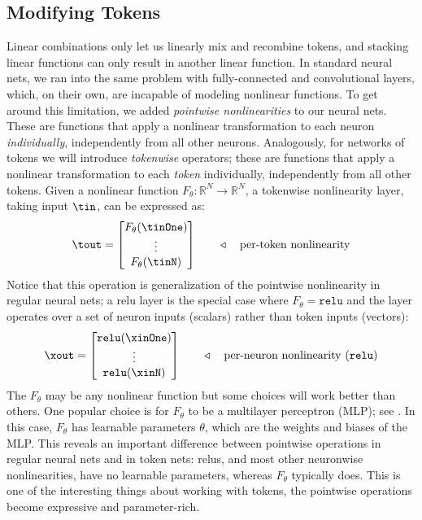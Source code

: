 \subsection{Modifying Tokens}\label{sec:transformers:modifying_tokens}
Linear combinations only let us linearly mix and recombine tokens, and stacking linear functions can only result in another linear function. In standard neural nets, we ran into the same problem with fully-connected and convolutional layers, which, on their own, are incapable of modeling nonlinear functions. To get around this limitation, we added \textit{pointwise nonlinearities} to our neural nets. These are functions that apply a nonlinear transformation to each neuron \textit{individually}, independently from all other neurons. Analogously, for networks of tokens we will introduce \textit{tokenwise} operators; these are functions that apply a nonlinear transformation to each \textit{token} individually, independently from all other tokens. Given a nonlinear function $F_{\theta}: \mathbb{R}^N \rightarrow \mathbb{R}^N$, a tokenwise nonlinearity layer, taking input $\tin$, can be expressed as:
\begin{align}
    \tout = 
        \begin{bmatrix}
        F_{\theta}(\tinOne) \\
        \vdots \\
        F_{\theta}(\tinN) \\
        \end{bmatrix}\quad\quad \triangleleft \quad\text{per-token nonlinearity}
\end{align}
Notice that this operation is generalization of the pointwise nonlinearity in regular neural nets; a relu layer is the special case where $F_{\theta} = \texttt{relu}$ and the layer operates over a set of neuron inputs (scalars) rather than token inputs (vectors):
\begin{align}
    \xout = 
        \begin{bmatrix}
        \texttt{relu}(\xinOne) \\
        \vdots \\
        \texttt{relu}(\xinN) \\
        \end{bmatrix}\quad\quad \triangleleft \quad\text{per-neuron nonlinearity (\texttt{relu})}
\end{align}
The $F_{\theta}$ may be any nonlinear function but some choices will work better than others. One popular choice is for $F_{\theta}$ to be a multilayer perceptron (MLP); see \chap{\ref{chapter:neural_nets}}. In this case, $F_{\theta}$ has learnable parameters $\theta$, which are the weights and biases of the MLP. This reveals an important difference between pointwise operations in regular neural nets and in token nets: relus, and most other neuronwise nonlinearities, have no learnable parameters, whereas $F_{\theta}$ typically does. This is one of the interesting things about working with tokens, the pointwise operations become expressive and parameter-rich.

